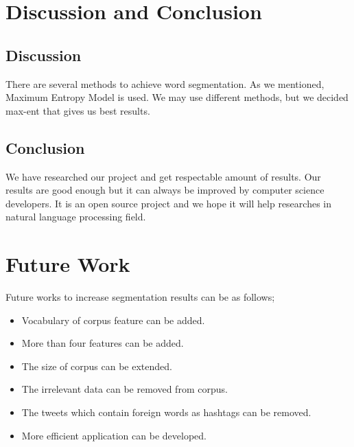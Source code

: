 \documentclass[12pt]{comjnl}
\begin{document}
\section{Discussion and Conclusion}
\subsection{Discussion}
There are several methods to achieve word segmentation. As we mentioned, Maximum Entropy Model is used. We may use different methods, but we decided max-ent that gives us best results.

\subsection{Conclusion}
We have researched our project and get respectable amount of results. Our results are good enough but it can always be improved by computer science developers. It is an open source project and we hope it will help researches in natural language processing field.

\section{Future Work}
Future works to increase segmentation results can be as follows;
\begin{itemize}
\item Vocabulary of corpus feature can be added.
\item More than four features can be added.
\item The size of corpus can be extended.
\item The irrelevant data can be removed from corpus.
\item The tweets which contain foreign words as hashtags can be removed.
\item More efficient application can be developed.
\end{itemize}
\end{document}
